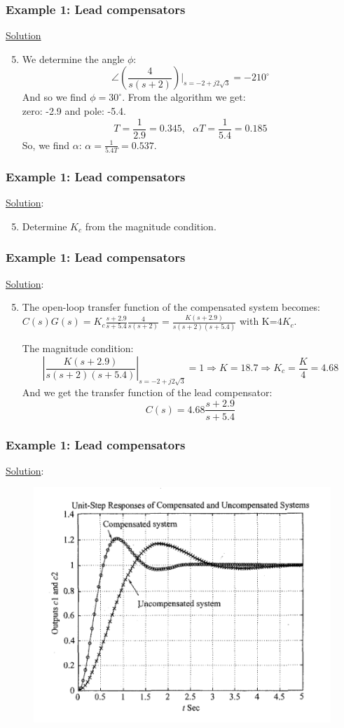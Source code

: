 \begin{frame}
	\frametitle{Example 1: Lead compensators}
	\underline{Solution}
	\begin{enumerate}
		\setcounter{enumi}{4}
		\item We determine the angle $\phi$: $$\angle(\frac{4}{s(s+2)})|_{s=-2+j2\sqrt{3}}=-210^{\circ}$$
		And so we find $\phi=30^{\circ}$. From the algorithm we get:\\ zero: -2.9 and pole: -5.4.\\
		$$T=\frac{1}{2.9}=0.345,\text{   } \alpha T=\frac{1}{5.4}=0.185$$
		So, we find $\alpha$: $\alpha=\frac{1}{5.4T}=0.537$.
	\end{enumerate}
\end{frame}

\begin{frame}
	\frametitle{Example 1: Lead compensators}
	\underline{Solution}:
	\begin{enumerate}
		\setcounter{enumi}{4}
		\item Determine $K_c$ from the magnitude condition.
	\end{enumerate}
\end{frame}

\begin{frame}
	\frametitle{Example 1: Lead compensators}
	\underline{Solution}:
	\begin{enumerate}
		\setcounter{enumi}{4}
		\item The open-loop transfer function of the compensated system becomes:\\
		$C(s)G(s)=K_c\frac{s+2.9}{s+5.4}\frac{4}{s(s+2)}=\frac{K(s+2.9)}{s(s+2)(s+5.4)}$ with K=$4K_c$.\vspace{3mm}
		
		The magnitude condition:
		$$|\frac{K(s+2.9)}{s(s+2)(s+5.4)}|_{s=-2+j2\sqrt{3}}=1 \Rightarrow K=18.7 \Rightarrow K_c=\frac{K}{4}=4.68$$
		And we get the transfer function of the lead compensator:
		$$C(s)=4.68\frac{s+2.9}{s+5.4}$$
	\end{enumerate}
\end{frame}

\begin{frame}
	\frametitle{Example 1: Lead compensators}
	\underline{Solution}:
	\begin{figure}
		\centering
		\includegraphics[width=0.7\linewidth]{Ex1_response}
	\end{figure}
\end{frame}


